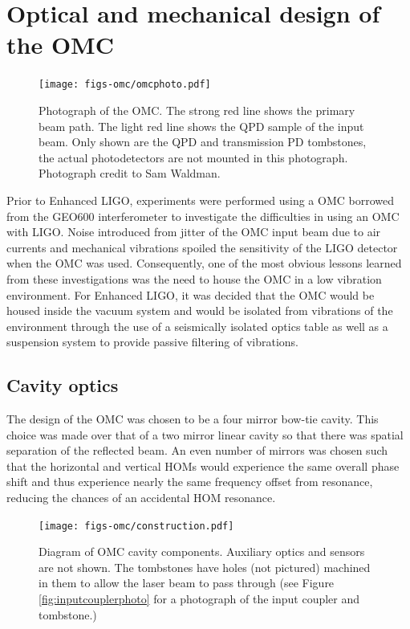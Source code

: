 \section{Optical and mechanical design of the OMC}
\begin{figure}
  \begin{center}
  \leavevmode
  \texttt{[image: figs-omc/omcphoto.pdf]}
  \end{center}
  \caption[Photograph of the OMC.]{Photograph of the OMC. The strong red line shows the primary beam path. The light red line shows the QPD sample of the input beam. Only shown are the QPD and transmission PD tombstones, the actual photodetectors are not mounted in this photograph. Photograph credit to Sam Waldman.}
  \label{fig:omcphoto}
\end{figure}
Prior to Enhanced LIGO, experiments were performed using a OMC borrowed from the GEO600 interferometer to investigate the difficulties in using an OMC with LIGO. %
Noise introduced from jitter of the OMC input beam due to air currents and mechanical vibrations spoiled the sensitivity of the LIGO detector when the OMC was used. %
Consequently, one of the most obvious lessons learned from these investigations was the need to house the OMC in a low vibration environment. %
For Enhanced LIGO, it was decided that the OMC would be housed inside the vacuum system and would be isolated from vibrations of the environment through the use of a seismically isolated optics table as well as a suspension system to provide passive filtering of vibrations.

\subsection{Cavity optics}
The design of the OMC was chosen to be a four mirror bow-tie cavity. %
This choice was made over that of a two mirror linear cavity so that there was spatial separation of the reflected beam. %
An even number of mirrors was chosen such that the horizontal and vertical HOMs would experience the same overall phase shift and thus experience nearly the same frequency offset from resonance, reducing the chances of an accidental HOM resonance.

\begin{figure}
  \begin{center}
  \leavevmode
  \texttt{[image: figs-omc/construction.pdf]}
  \end{center}
  \caption[Diagram of OMC cavity components]{Diagram of OMC cavity components. Auxiliary optics and sensors are not shown. The tombstones have holes (not pictured) machined in them to allow the laser beam to pass through (see Figure \ref{fig:inputcouplerphoto} for a photograph of the input coupler and tombstone.)}
  \label{fig:omcconstruction}
\end{figure}

